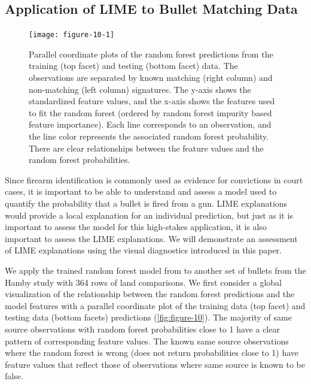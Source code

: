 \documentclass[AMS,STIX2COL]{WileyNJD-v2}\usepackage[]{graphicx}\usepackage[]{color}
\newenvironment{knitrout}{}{} %
\begin{document}
\subsection{Application of LIME to Bullet Matching Data}

\begin{figure}[!thp]
\begin{knitrout}
\color{fgcolor}

{\centering \texttt{[image: figure-10-1]} 

}



\end{knitrout}
\caption{Parallel coordinate plots of the \citet{hare:2016} random forest predictions from the training (top facet) and testing (bottom facet) data. The observations are separated by known matching (right column) and non-matching (left column) signatures. The y-axis shows the standardized feature values, and the x-axis shows the features used to fit the random forest (ordered by random forest impurity based feature importance). Each line corresponds to an observation, and the line color represents the associated random forest probability. There are clear relationships between the feature values and the random forest probabilities.}
\label{fig:figure-10}
\end{figure}

Since firearm identification is commonly used as evidence for convictions in court cases, it is important to be able to understand and assess a model used to quantify the probability that a bullet is fired from a gun. LIME explanations would provide a local explanation for an individual prediction, but just as it is important to assess the model for this high-stakes application, it is also important to assess the LIME explanations. We will demonstrate an assessment of LIME explanations using the visual diagnostics introduced in this paper.

We apply the trained random forest model from \citet{hare:2016} to another set of bullets from the Hamby study with 364 rows of land comparisons. We first consider a global visualization of the relationship between the random forest predictions and the model features with a parallel coordinate plot of the training data (top facet) and testing data (bottom facets) predictions (\autoref{fig:figure-10}). The majority of same source observations with random forest probabilities close to 1 have a clear pattern of corresponding feature values. The known same source observations where the random forest is wrong (does not return probabilities close to 1) have feature values that reflect those of observations where same source is known to be false.
\end{document}

